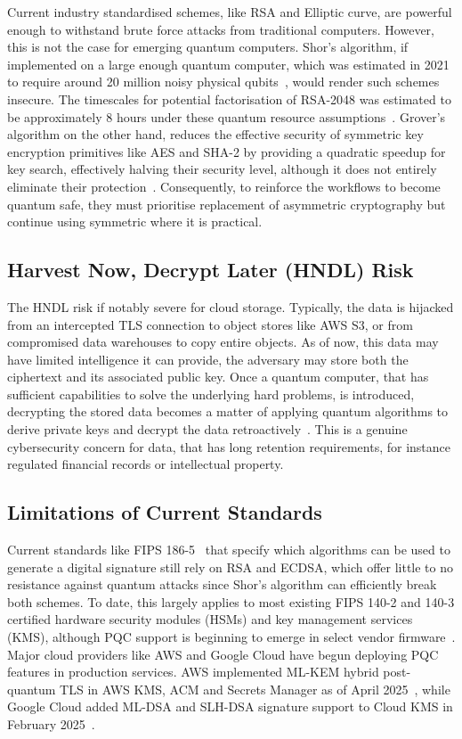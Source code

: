\documentclass[12pt,a4paper]{article}
\begin{document}
Current industry standardised schemes, like RSA and Elliptic curve, are powerful enough to withstand brute force attacks from traditional computers. However, this is not the case for emerging quantum computers. Shor's algorithm, if implemented on a large enough quantum computer, which was estimated in 2021 to require around 20 million noisy physical qubits~\cite{gidney-ekera-2021}, would render such schemes insecure. The timescales for potential factorisation of RSA-2048 was estimated to be approximately 8 hours under these quantum resource assumptions~\cite{gidney-ekera-2021}. Grover's algorithm on the other hand, reduces the effective security of symmetric key encryption primitives like AES and SHA-2 by providing a quadratic speedup for key search, effectively halving their security level, although it does not entirely eliminate their protection~\cite{grover1996}. Consequently, to reinforce the workflows to become quantum safe, they must prioritise replacement of asymmetric cryptography but continue using symmetric where it is practical.

\subsection{Harvest Now, Decrypt Later (HNDL) Risk}

The HNDL risk if notably severe for cloud storage. Typically, the data is hijacked from an intercepted TLS connection to object stores like AWS S3, or from compromised data warehouses to copy entire objects. As of now, this data may have limited intelligence it can provide, the adversary may store both the ciphertext and its associated public key. Once a quantum computer, that has sufficient capabilities to solve the underlying hard problems, is introduced, decrypting the stored data becomes a matter of applying quantum algorithms to derive private keys and decrypt the data retroactively~\cite{sectigo-hndl-2025,hashicorp-hndl-2025}. This is a genuine cybersecurity concern for data, that has long retention requirements, for instance regulated financial records or intellectual property. 

\subsection{Limitations of Current Standards}
Current standards like FIPS 186-5~\cite{nist-fips-186-5-2023} that specify which algorithms can be used to generate a digital signature still rely on RSA and ECDSA, which offer little to no resistance against quantum attacks since Shor's algorithm can efficiently break both schemes. To date, this largely applies to most existing FIPS 140-2 and 140-3 certified hardware security modules (HSMs) and key management services (KMS), although PQC support is beginning to emerge in select vendor firmware~\cite{thales-mldsa-2025}. Major cloud providers like AWS and Google Cloud have begun deploying PQC features in production services. AWS implemented ML-KEM hybrid post-quantum TLS in AWS KMS, ACM and Secrets Manager as of April 2025~\cite{aws-mlkem-deployment-2025}, while Google Cloud added ML-DSA and SLH-DSA signature support to Cloud KMS in February 2025~\cite{google-cloud-kms-pqc-2025}.
\end{document}
